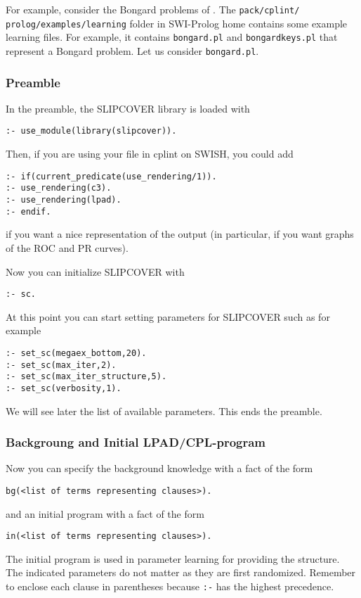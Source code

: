 \documentclass[a4paper,10pt]{article}
\begin{document}
For example, consider the Bongard problems of \cite{RaeLae95-ALT95}. 
The \texttt{pack/cplint/ prolog/examples/learning} folder in SWI-Prolog home contains some example learning files. 
For example, it contains \verb|bongard.pl| and \verb|bongardkeys.pl| that represent a Bongard problem.
Let us consider \verb|bongard.pl|.

\subsubsection{Preamble}
In the preamble, the SLIPCOVER library is loaded with
\begin{verbatim}
:- use_module(library(slipcover)).
\end{verbatim}
Then, if you are using your file in cplint on SWISH, you could add
\begin{verbatim}
:- if(current_predicate(use_rendering/1)).
:- use_rendering(c3).
:- use_rendering(lpad).
:- endif.
\end{verbatim}
if you want a nice representation of the output (in particular, if you want graphs of the ROC and PR curves).

Now you can initialize SLIPCOVER with
\begin{verbatim}
:- sc.
\end{verbatim}
At this point you can start setting parameters for SLIPCOVER such as for example
\begin{verbatim}
:- set_sc(megaex_bottom,20).
:- set_sc(max_iter,2).
:- set_sc(max_iter_structure,5).
:- set_sc(verbosity,1).
\end{verbatim}
We will see later the list of available parameters.
This ends the preamble.

\subsubsection{Backgroung and Initial LPAD/CPL-program}
%
Now you can specify the background knowledge with a 
fact of the form 
\begin{verbatim}
bg(<list of terms representing clauses>).
\end{verbatim}
and an initial program with a fact of the form 
\begin{verbatim}
in(<list of terms representing clauses>).
\end{verbatim}
The initial program is used in parameter learning for providing 
the structure. The indicated parameters do not matter as they are first randomized.
Remember to enclose each clause in parentheses because \verb|:-| has the highest precedence.
\end{document}
